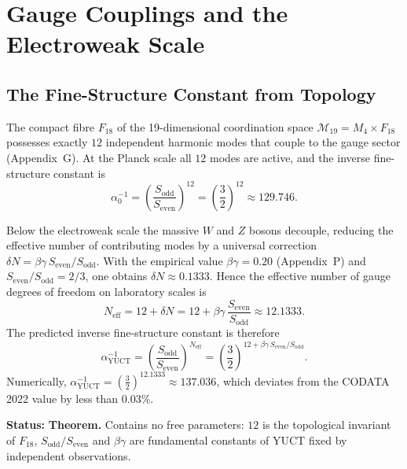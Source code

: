 \documentclass[12pt,a4paper]{article}
\begin{document}
	\section{Gauge Couplings and the Electroweak Scale}
	\label{sec:gauge}
	
	\subsection{The Fine-Structure Constant from Topology}
	
	The compact fibre \(F_{18}\) of the 19-dimensional coordination space \(\mathcal{M}_{19}=M_4\times F_{18}\) possesses exactly \(12\) independent harmonic modes that couple to the gauge sector (Appendix~G). At the Planck scale all \(12\) modes are active, and the inverse fine-structure constant is
	\begin{equation}
		\alpha_0^{-1} = \left(\frac{S_{\mathrm{odd}}}{S_{\mathrm{even}}}\right)^{12}
		= \left(\frac{3}{2}\right)^{12} \approx 129.746 .
	\end{equation}
	
	Below the electroweak scale the massive \(W\) and \(Z\) bosons decouple, reducing the effective number of contributing modes by a universal correction \(\delta N = \beta\gamma \, S_{\mathrm{even}}/S_{\mathrm{odd}}\). With the empirical value \(\beta\gamma = 0.20\) (Appendix~P) and \(S_{\mathrm{even}}/S_{\mathrm{odd}} = 2/3\), one obtains \(\delta N \approx 0.1333\). Hence the effective number of gauge degrees of freedom on laboratory scales is
	\begin{equation}
		N_{\mathrm{eff}} = 12 + \delta N = 12 + \beta\gamma\,\frac{S_{\mathrm{even}}}{S_{\mathrm{odd}}} \approx 12.1333 .
	\end{equation}
	The predicted inverse fine-structure constant is therefore
	\begin{equation}
		\boxed{\alpha^{-1}_{\mathrm{YUCT}} =
			\left(\frac{S_{\mathrm{odd}}}{S_{\mathrm{even}}}\right)^{N_{\mathrm{eff}}}
			= \left(\frac{3}{2}\right)^{12 + \beta\gamma\,S_{\mathrm{even}}/S_{\mathrm{odd}}} } .
		\label{eq:alpha-yuct}
	\end{equation}
	Numerically, \(\alpha^{-1}_{\mathrm{YUCT}} = \left(\frac{3}{2}\right)^{12.1333} \approx 137.036\), which deviates from the CODATA 2022 value by less than \(0.03\%\).
	
	\textbf{Status:} \textbf{Theorem.} Contains no free parameters: \(12\) is the topological invariant of \(F_{18}\), \(S_{\mathrm{odd}}/S_{\mathrm{even}}\) and \(\beta\gamma\) are fundamental constants of YUCT fixed by independent observations.
	
\end{document}
